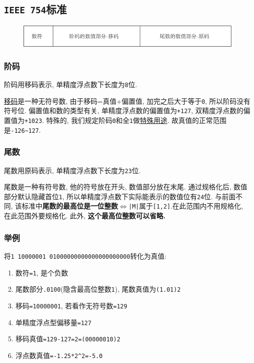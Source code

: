 \subsection{\texttt{IEEE 754}标准}\label{IEEE 754} %
\begin{figure}[H]
\centering
\includegraphics[scale=.5]{img/figure10.pdf}
\end{figure}
\subsubsection{阶码}
阶码用移码表示, 单精度浮点数下长度为\verb|8|位. \par
\hyperref[移码]{移码}是一种无符号数, 由于移码=真值+偏置值, 加完之后大于等于\verb|0|, 所以阶码没有符号位. 偏置值和数的类型有关, 单精度浮点数的偏置值为\verb|+127|, 双精度浮点数的偏置值为\verb|+1023|. 特殊的, 我们规定阶码\verb|0|和全\verb|1|做\hyperref[特殊用途]{特殊用途}. 故真值的正常范围是\verb|-126~127|.
\subsubsection{尾数}
尾数用原码表示, 单精度浮点数下长度为\verb|23|位. \par
尾数是一种有符号数, 他的符号放在开头, 数值部分放在末尾. 通过规格化后, 数值部分默认隐藏首位\verb|1|, 所以单精度浮点数下实际能表示的数值位有\verb|24|位. 与前面不同, 该标准中\textbf{尾数的最高位是一位整数}$ \Leftrightarrow $\texttt{|M|}属于\verb|[1,2]|.在此范围内不用规格化, 在此范围外要规格化. 此外, \textbf{这个最高位整数可以省略.}
\subsubsection{举例}
将\verb|1 10000001 01000000000000000000000|转化为真值:\par 
\begin{enumerate}
\item 数符\verb|=1|, 是个负数
\item 尾数部分\verb|.0100|(隐含最高位整数\verb|1|), 尾数真值为\verb|(1.01)2|
\item 移码\verb|=10000001|, 若看作无符号数\verb|=129|
\item 单精度浮点型偏移量\verb|=127|
\item 移码真值\verb|=129-127=2=(00000010)2|
\item 浮点数真值\verb|=-1.25*2^2=-5.0|
\end{enumerate}

